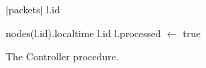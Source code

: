 \begin{algorithm}[H]
{{{                \Send $|$packets$|$ \To l.id\; \label{line:sendcount}                   
                

                \Send nodes(l.id).localtime \KwTo l.id 
                l.processed $\leftarrow$ true\;
            }


        }
    }
    \caption{The Controller procedure.}
    \label{algo:mpicontroller}
\end{algorithm}



















    
    

 

